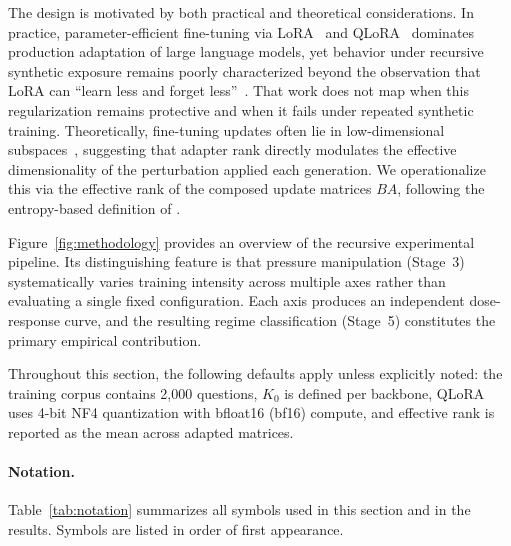 \documentclass[a4paper,fleqn]{cas-dc}
\begin{document}
The design is motivated by both practical and theoretical considerations. In
practice, parameter-efficient fine-tuning via LoRA~\citep{hu2022} and
QLoRA~\citep{dettmers2023} dominates production adaptation of large language
models, yet behavior under recursive synthetic exposure remains poorly
characterized beyond the observation that LoRA can ``learn less and forget
less''~\citep{biderman2024}. That work does not map when this regularization
remains protective and when it fails under repeated synthetic training.
Theoretically, fine-tuning updates often lie in low-dimensional
subspaces~\citep{aghajanyan2021}, suggesting that adapter rank directly
modulates the effective dimensionality of the perturbation applied each
generation. We operationalize this via the effective rank of the composed update
matrices $BA$, following the entropy-based definition of
\citet{roy2007}.

Figure~\ref{fig:methodology} provides an overview of the recursive experimental
pipeline. Its distinguishing feature is that pressure manipulation (Stage~3)
systematically varies training intensity across multiple axes rather than
evaluating a single fixed configuration. Each axis produces an independent
dose-response curve, and the resulting regime classification (Stage~5)
constitutes the primary empirical contribution.

Throughout this section, the following defaults apply unless explicitly noted:
the training corpus contains 2{,}000 questions, $K_0$ is defined per backbone,
QLoRA uses 4-bit NF4 quantization with bfloat16 (bf16) compute, and effective rank is
reported as the mean across adapted matrices.

\paragraph{Notation.}
Table~\ref{tab:notation} summarizes all symbols used in this section and in
the results.  Symbols are listed in order of first appearance.
\end{document}
